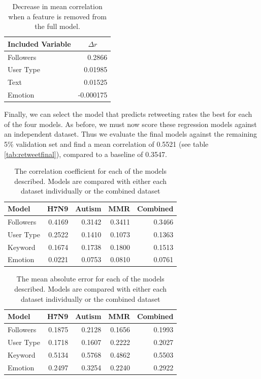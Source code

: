\begin{table}[]
\centering
\begin{tabular}{l|r}
\multicolumn{1}{c|}{Included Variable} & \multicolumn{1}{c}{\(\Delta r\)} \\ \hline
Followers                              & 0.2866                       \\
User Type                              & 0.01985                      \\
Text                                   & 0.01525                      \\
Emotion                                & -0.000175                   
\end{tabular}
\caption{Decrease in mean correlation when a feature is removed from the full model.}
\label{tab:featureeffects}
\end{table}

Finally, we can select the model that predicts retweeting rates the best for each of the four models. As before, we must now score these regression models against an independent dataset. Thus we evaluate the final models against the remaining 5\% validation set and find a mean correlation of 0.5521 (see table \ref{tab:retweetfinal}), compared to a baseline of 0.3547.

\begin{table}
\centering
\begin{tabular}{l|r|r|r|r}
Model & H7N9 & Autism & MMR & Combined\\ \hline
Followers & 0.4169 & 0.3142 &0.3411 &  0.3466\\
User Type & 0.2522 & 0.1410 & 0.1073 & 0.1363 \\
Keyword & 0.1674 &  0.1738& 0.1800
 & 0.1513 \\
Emotion & 0.0221 & 0.0753 & 0.0810 & 0.0761 \\ 
\end{tabular}
\caption{The correlation coefficient for each of the models described. Models are compared with either each dataset individually or the combined dataset}
\label{tab:modelfits}
\end{table}

\begin{table}
\centering
\begin{tabular}{l|r|r|r|r}
Model & H7N9 & Autism & MMR & Combined\\ \hline
Followers & 0.1875 & 0.2128 & 0.1656 & 0.1993 \\
User Type & 0.1718 & 0.1607 &  0.2222 & 0.2027 \\
Keyword & 0.5134  & 0.5768 & 0.4862 & 0.5503\\
Emotion & 0.2497& 0.3254&0.2240 & 0.2922\\
\end{tabular}
\caption{The mean absolute error for each of the models described. Models are compared with either each dataset individually or the combined dataset}
\label{tab:modelerror}
\end{table}


